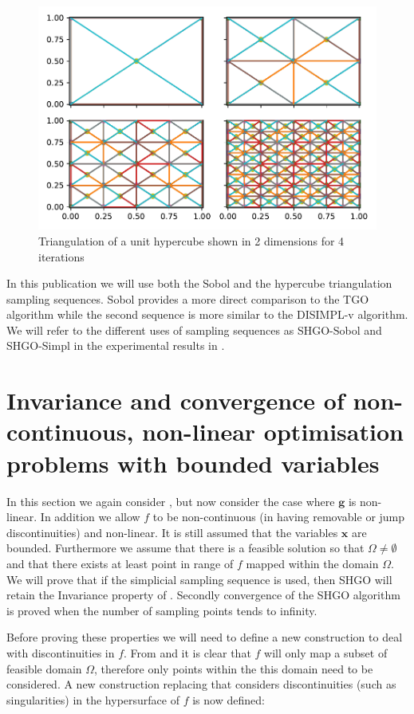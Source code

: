 \begin{figure}
\centerline{\includegraphics[scale=1.0]{./Fig10.pdf}}
{\caption{Triangulation of a unit hypercube shown in 2 dimensions for 4 iterations  \label{fig:triangles} }}
\end{figure}

In this publication we will use both the Sobol and the hypercube triangulation sampling sequences. Sobol provides a more direct comparison to the TGO algorithm while the second sequence is more similar to the DISIMPL-v algorithm. We will refer to the different uses of sampling sequences as SHGO-Sobol and SHGO-Simpl in the experimental results in .

\section{Invariance and convergence of non-continuous, non-linear optimisation problems with bounded variables}
In this section we again consider , but now consider the case where $\mathbf{g}$ is non-linear. In addition we allow $f$ to be non-continuous (in having removable or jump discontinuities) and non-linear. It is still assumed that the variables $\mathbf{x}$ are bounded. Furthermore we assume that there is a feasible solution so that $\Omega \neq \emptyset$ and that there exists at least point in range of $f$ mapped within the domain $\Omega$. We will prove that if the simplicial sampling sequence \citep{SHGOpy} is used, then SHGO will retain the Invariance property of . Secondly convergence of the SHGO algorithm is proved when the number of sampling points tends to infinity.

Before proving these properties we will need to define a new construction to deal with discontinuities in $f$. From  and  it is clear that $f$ will only map a subset of feasible domain $\Omega$, therefore only points within the this domain need to be considered. A new construction replacing  that considers discontinuities (such as singularities) in the hypersurface of $f$ is now defined:

